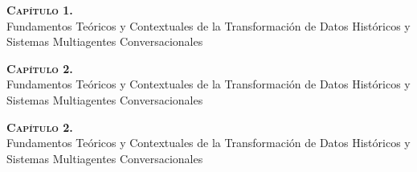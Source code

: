 \documentclass[spanish,authorshippage=ltd]{thesis} %
\begin{document}
	
	\newpage
	\vspace*{\fill} %
	\textsc{\Large \bfseries Capítulo 1.\\ }
	\Large{Fundamentos Teóricos y Contextuales de la Transformación de Datos Históricos y Sistemas Multiagentes Conversacionales}
	\vspace*{\fill} %
	\thispagestyle{empty}
	\addtocounter{page}{-1}
	\newpage
	\newpage
	\vspace*{\fill} %
	\textsc{\Large \bfseries Capítulo 2.\\ }
	\Large{Fundamentos Teóricos y Contextuales de la Transformación de Datos Históricos y Sistemas Multiagentes Conversacionales}
	\vspace*{\fill} %
	\thispagestyle{empty}
	\addtocounter{page}{-1}
	\newpage
	
	\newpage
	\vspace*{\fill} %
	\textsc{\Large \bfseries Capítulo 2.\\ }
	\Large{Fundamentos Teóricos y Contextuales de la Transformación de Datos Históricos y Sistemas Multiagentes Conversacionales}
	\vspace*{\fill} %
	\thispagestyle{empty}
	\addtocounter{page}{-1}
	\newpage
	
	
	
	\appendix
	
	\renewcommand\bibname{Referencias bibliográficas}
	
	\label{bibliography}
	
\end{document}
